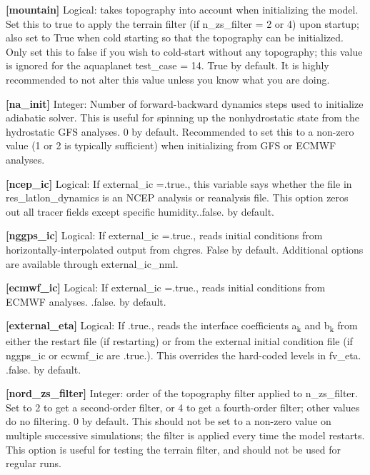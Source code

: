 {\bfseries \mbox{[}mountain\mbox{]}} Logical\+: takes topography into account when initializing the model. Set this to true to apply the terrain filter (if n\+\_\+zs\+\_\+filter = 2 or 4) upon startup; also set to True when cold starting so that the topography can be initialized. Only set this to false if you wish to cold-\/start without any topography; this value is ignored for the aquaplanet test\+\_\+case = 14. True by default. It is highly recommended to not alter this value unless you know what you are doing.

{\bfseries \mbox{[}na\+\_\+init\mbox{]}} Integer\+: Number of forward-\/backward dynamics steps used to initialize adiabatic solver. This is useful for spinning up the nonhydrostatic state from the hydrostatic G\+FS analyses. 0 by default. Recommended to set this to a non-\/zero value (1 or 2 is typically sufficient) when initializing from G\+FS or E\+C\+M\+WF analyses.

{\bfseries \mbox{[}ncep\+\_\+ic\mbox{]}} Logical\+: If external\+\_\+ic =.true., this variable says whether the file in res\+\_\+latlon\+\_\+dynamics is an N\+C\+EP analysis or reanalysis file. This option zeros out all tracer fields except specific humidity..false. by default.

{\bfseries \mbox{[}nggps\+\_\+ic\mbox{]}} Logical\+: If external\+\_\+ic =.true., reads initial conditions from horizontally-\/interpolated output from chgres. False by default. Additional options are available through external\+\_\+ic\+\_\+nml.

{\bfseries \mbox{[}ecmwf\+\_\+ic\mbox{]}} Logical\+: If external\+\_\+ic =.true., reads initial conditions from E\+C\+M\+WF analyses. .false. by default.

{\bfseries \mbox{[}external\+\_\+eta\mbox{]}} Logical\+: If .true., reads the interface coefficients a\textsubscript{k} and b\textsubscript{k} from either the restart file (if restarting) or from the external initial condition file (if nggps\+\_\+ic or ecwmf\+\_\+ic are .true.). This overrides the hard-\/coded levels in fv\+\_\+eta. .false. by default.

{\bfseries \mbox{[}nord\+\_\+zs\+\_\+filter\mbox{]}} Integer\+: order of the topography filter applied to n\+\_\+zs\+\_\+filter. Set to 2 to get a second-\/order filter, or 4 to get a fourth-\/order filter; other values do no filtering. 0 by default. This should not be set to a non-\/zero value on multiple successive simulations; the filter is applied every time the model restarts. This option is useful for testing the terrain filter, and should not be used for regular runs.

